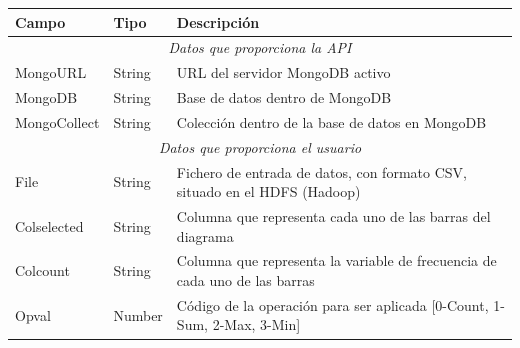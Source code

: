 \begin{tabular}{|l|l|p{7cm}|}
	\hline 
	\textbf{Campo} & \textbf{Tipo} & \textbf{Descripción} \\ 
	\hline \hline
	\multicolumn{3}{|c|}{\textit{Datos que proporciona la API}} \\
	\hline 
	MongoURL & String & URL del servidor MongoDB activo \\ 
	\hline 
	MongoDB & String & Base de datos dentro de MongoDB \\ 
	\hline 
	MongoCollect& String & Colección dentro de la base de datos en MongoDB \\ 
	\hline \hline
	\multicolumn{3}{|c|}{\textit{Datos que proporciona el usuario}} \\
	\hline 
	File & String & Fichero de entrada de datos, con formato CSV, situado en el HDFS (Hadoop) \\ 
	\hline 
	Colselected & String & Columna que representa cada uno de las barras del diagrama \\ 
	\hline 
	Colcount & String & Columna que representa la variable de frecuencia de cada uno de las barras \\ 
	\hline 
	Opval & Number & Código de la operación para ser aplicada [0-Count, 1-Sum, 2-Max, 3-Min] \\ 
	\hline  
\end{tabular} 

